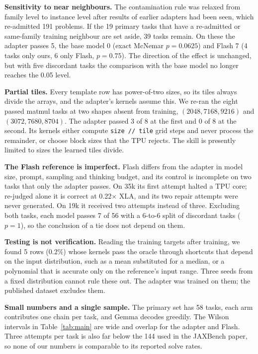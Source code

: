\documentclass[conference]{IEEEtran}
\newcommand{\x}{$\times$}
\begin{document}
\textbf{Sensitivity to near neighbours.} The contamination rule was relaxed from family level to instance level after
results of earlier adapters had been seen, which re-admitted 191 problems. If the 19 primary tasks that have a re-admitted or
same-family training neighbour are set aside, 39 tasks remain. On these the adapter passes 5, the base model 0 (exact McNemar
$p = 0.0625$) and Flash 7 (4 tasks only ours, 6 only Flash, $p = 0.75$). The direction of the effect is unchanged, but with
five discordant tasks the comparison with the base model no longer reaches the 0.05 level.

\textbf{Partial tiles.} Every template row has power-of-two sizes, so its tiles always divide the arrays, and the adapter's
kernels assume this. We re-ran the eight passed matmul tasks at two shapes absent from training, $(2048, 7168, 9216)$ and
$(3072, 7680, 8704)$. The adapter passed 3 of 8 at the first and 0 of 8 at the second. Its kernels either compute
\texttt{size // tile} grid steps and never process the remainder, or choose block sizes that the TPU rejects. The skill is
presently limited to sizes the learned tiles divide.

\textbf{The Flash reference is imperfect.} Flash differs from the adapter in model size, prompt, sampling and thinking budget,
and its control is incomplete on two tasks that only the adapter passes. On 35k its first attempt halted a TPU core; re-judged
alone it is correct at 0.22\x{} XLA, and its two repair attempts were never generated. On 19k it received two attempts instead
of three. Excluding both tasks, each model passes 7 of 56 with a 6-to-6 split of discordant tasks ($p = 1$), so the conclusion
of a tie does not depend on them.

\textbf{Testing is not verification.} Reading the training targets after training, we found 5 rows (0.2\%) whose kernels pass
the oracle through shortcuts that depend on the input distribution, such as a mean substituted for a median, or a polynomial
that is accurate only on the reference's input range. Three seeds from a fixed distribution cannot rule these out. The adapter
was trained on them; the published dataset excludes them.

\textbf{Small numbers and a single sample.} The primary set has 58 tasks, each arm contributes one chain per task, and Gemma
decodes greedily. The Wilson intervals in Table~\ref{tab:main} are wide and overlap for the adapter and Flash. Three attempts
per task is also far below the 144 used in the JAXBench paper, so none of our numbers is comparable to its reported solve
rates.
\end{document}

